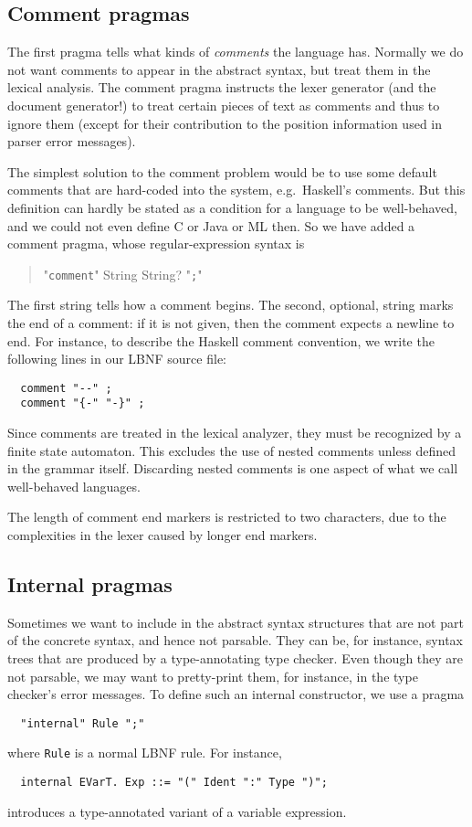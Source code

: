\documentclass[10pt]{article}
\newcommand{\bequ}{\begin{quote}}
\newcommand{\enqu}{\end{quote}}
\begin{document}
\subsection{Comment pragmas}

The first pragma tells what kinds of \textit{comments} the language has.
Normally we do not want comments to appear in the abstract syntax,
but treat them in the lexical analysis. The comment pragma instructs the
lexer generator (and the document generator!) to
treat certain pieces of text as comments and thus to ignore them
(except for their contribution to the position information used in
parser error messages).

The simplest solution to the comment
problem would be to use some default comments
that are hard-coded into the system, e.g.\ Haskell's comments.
But this definition can hardly be stated as a condition for a language
to be well-behaved, and we could not even
define C or Java or ML then. So we have added a comment pragma, whose
regular-expression syntax is
\bequ
  "{\tt comment}" String String? "{\tt ;}"
\enqu
The first string tells how a comment begins.
The second, optional, string marks the end of a comment:
if it is not given, then the comment expects a newline to end.
For instance, to describe the Haskell comment convention,
we write the following lines in our LBNF source file:
\begin{verbatim}
  comment "--" ;
  comment "{-" "-}" ;
\end{verbatim}
Since comments are treated in the lexical analyzer, they must
be recognized by a finite state automaton.
This excludes the use of nested comments unless defined in
the grammar itself. Discarding nested comments is one aspect
of what we call well-behaved languages.

The length of comment end markers is restricted to two characters,
due to the complexities in the lexer caused by longer end markers.



\subsection{Internal pragmas}

Sometimes we want to include in the abstract syntax
structures that are not part of the concrete syntax,
and hence not parsable.
They can be, for instance, syntax trees that are produced by a
type-annotating type checker.
Even though they are not parsable, we may want to
pretty-print them, for instance, in the type checker's
error messages.
To define such an internal constructor, we use a pragma
\begin{verbatim}
  "internal" Rule ";"
\end{verbatim}
where {\tt Rule} is a normal LBNF rule. For instance,
\begin{verbatim}
  internal EVarT. Exp ::= "(" Ident ":" Type ")";
\end{verbatim}
introduces a type-annotated variant of a variable expression.
\end{document}
